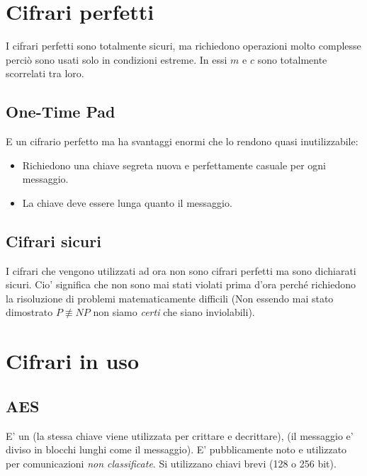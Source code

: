 \section{Cifrari perfetti}
I cifrari perfetti sono totalmente sicuri, ma richiedono operazioni molto complesse perciò sono usati solo in condizioni estreme.
In essi $m$ e $c$ sono totalmente scorrelati tra loro.
\subsection{One-Time Pad}
E un cifrario perfetto ma ha svantaggi enormi che lo rendono quasi inutilizzabile:
\begin{itemize}
    \item Richiedono una chiave segreta nuova e perfettamente casuale per ogni messaggio.
    \item La chiave deve essere lunga quanto il messaggio.
\end{itemize}
\subsection{Cifrari sicuri}
I cifrari che vengono utilizzati ad ora non sono cifrari perfetti ma sono dichiarati sicuri. Cio' significa che non sono mai stati violati prima d'ora perché richiedono la risoluzione di problemi matematicamente difficili (Non essendo mai stato dimostrato $P \not\equiv NP$ non siamo \textit{certi} che siano inviolabili).
\section{Cifrari in uso}
\subsection{AES}
E' un  (la stessa chiave viene utilizzata per crittare e decrittare),  (il messaggio e' diviso in blocchi lunghi come il messaggio).
E' pubblicamente noto e utilizzato per comunicazioni \textit{non classificate}.
Si utilizzano chiavi brevi (128 o 256 bit).